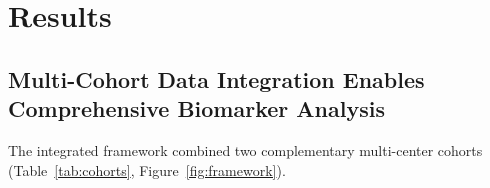 \documentclass[11pt]{article}
\begin{document}
\section{Results}

\subsection{Multi-Cohort Data Integration Enables Comprehensive Biomarker Analysis}

The integrated framework combined two complementary multi-center cohorts (Table~\ref{tab:cohorts}, Figure~\ref{fig:framework}).
\end{document}
